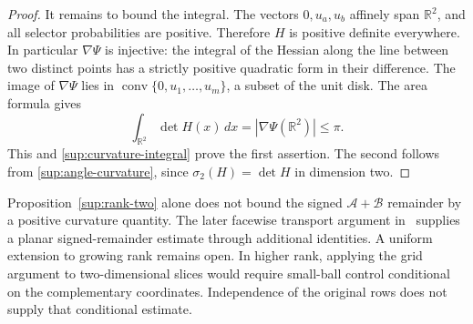 \documentclass[11pt,a4paper]{article}
\theoremstyle{remark}
\newcommand{\R}{\mathbb R}
\newcommand{\dd}{\,d}
\begin{document}
\begin{proof}
It remains to bound the integral. The vectors \(0,u_a,u_b\) affinely
span \(\R^2\), and all selector probabilities are positive. Therefore
\(H\) is positive
definite everywhere. In particular \(\nabla\Psi\) is injective:
the integral of the Hessian along the line between two distinct points
has a strictly positive quadratic form in their difference.
The image of \(\nabla\Psi\) lies in
\(\operatorname{conv}\{0,u_1,\ldots,u_m\}\), a subset of the unit
disk. The area formula gives
\[
 \int_{\R^2}\det H(x)\dd x
 =|\nabla\Psi(\R^2)|\le\pi.
\]
This and \eqref{sup:curvature-integral} prove the first assertion.
The second follows from \eqref{sup:angle-curvature}, since
\(\sigma_2(H)=\det H\) in dimension two.
\end{proof}

Proposition~\ref{sup:rank-two} alone does not bound the signed
\(\mathcal A+\mathcal B\) remainder by a positive curvature quantity.
The later facewise transport argument in~\cite{Cancellation} supplies
a planar signed-remainder estimate through additional identities.
A uniform extension to growing rank remains open.
In higher rank, applying the grid argument to two-dimensional slices
would require small-ball control conditional on the complementary
coordinates. Independence of the original rows does not supply that
conditional estimate.
\end{document}
